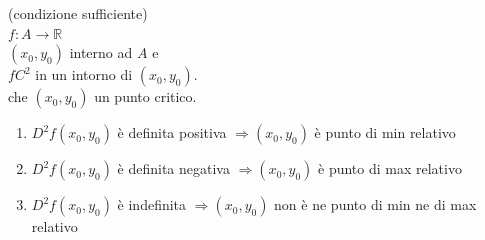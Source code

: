 \documentclass[a4paper, oneside]{article}
\begin{document}
        \begin{theorem}
            (condizione sufficiente)\\
             $f : A \to \mathbb{R}$\\
             $(x_0,y_0)$ interno ad $A$ e \\
             $f C^2$ in un intorno di $(x_0,y_0)$.\\
             che $(x_0,y_0)$ un punto critico.\\
            \begin{enumerate}[$i)$]
                \item {} $D^2f(x_0,y_0)$ è definita positiva $\Rightarrow (x_0,y_0)$ è punto di min relativo
                \item {} $D^2f(x_0,y_0)$ è definita negativa $\Rightarrow (x_0,y_0)$ è punto di max relativo
                \item {} $D^2f(x_0,y_0)$ è indefinita $\Rightarrow (x_0,y_0)$ non è ne punto di min ne di max relativo
            \end{enumerate}
        \end{theorem}
\end{document}
